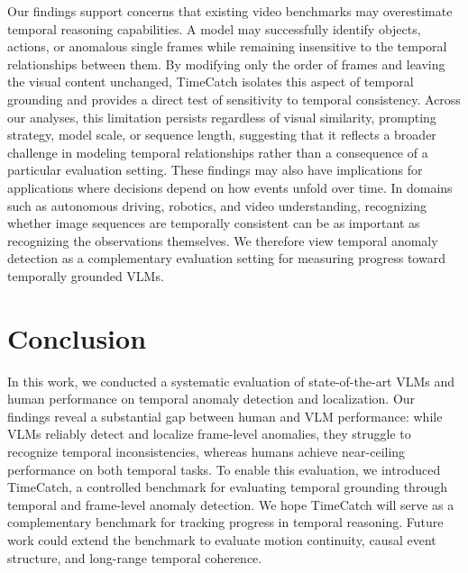 \documentclass[11pt]{article}
\begin{document}
Our findings support concerns that existing video benchmarks may overestimate temporal reasoning capabilities. A model may successfully identify objects, actions, or anomalous single frames while remaining insensitive to the temporal relationships between them. By modifying only the order of frames and leaving the visual content unchanged, TimeCatch isolates this aspect of temporal grounding and provides a direct test of sensitivity to temporal consistency. 
Across our analyses, this limitation persists regardless of visual similarity, prompting strategy, model scale, or sequence length, suggesting that it reflects a broader challenge in modeling temporal relationships rather than a consequence of a particular evaluation setting.
These findings may also have implications for applications where decisions depend on how events unfold over time. In domains such as autonomous driving, robotics, and video understanding, recognizing whether image sequences are temporally consistent can be as important as recognizing the observations themselves. We therefore view temporal anomaly detection as a complementary evaluation setting for measuring progress toward temporally grounded VLMs.

\section{Conclusion}

In this work, we conducted a systematic evaluation of state-of-the-art VLMs and human performance on temporal anomaly detection and localization. Our findings reveal a substantial gap between human and VLM performance: while VLMs reliably detect and localize frame-level anomalies, they struggle to recognize temporal inconsistencies, whereas humans achieve near-ceiling performance on both temporal tasks. To enable this evaluation, we introduced TimeCatch, a controlled benchmark for evaluating temporal grounding through temporal and frame-level anomaly detection. We hope TimeCatch will serve as a complementary benchmark for tracking progress in temporal reasoning. Future work could extend the benchmark to evaluate motion continuity, causal event structure, and long-range temporal coherence.
\end{document}
